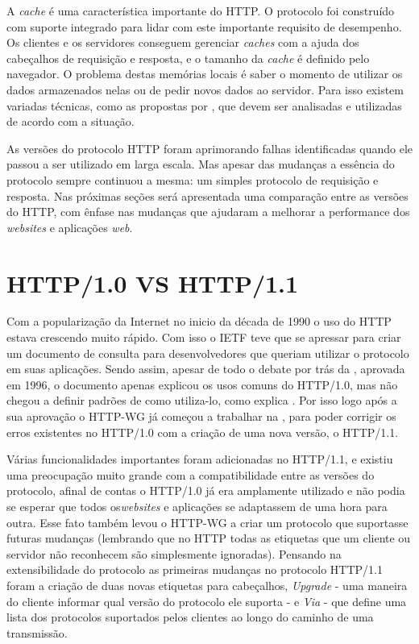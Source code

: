

A \textit{cache} é uma característica importante do HTTP. O protocolo foi construído com suporte integrado para lidar com este importante requisito de desempenho. Os clientes e os servidores conseguem gerenciar \textit{caches} com a ajuda dos cabeçalhos de requisição e resposta, e o tamanho da \textit{cache} é definido pelo navegador. O problema destas memórias locais é saber o momento de utilizar os dados armazenados nelas ou de pedir novos dados ao servidor. Para isso existem variadas técnicas, como as propostas por \cite{HighPerformance}, que devem ser analisadas e utilizadas de acordo com a situação.

As versões do protocolo HTTP foram aprimorando falhas identificadas quando ele passou a ser utilizado em larga escala. Mas apesar das mudanças a essência do protocolo sempre continuou a mesma: um simples protocolo de requisição e resposta. Nas próximas seções será apresentada uma comparação entre as versões do HTTP, com ênfase nas mudanças que ajudaram a melhorar a performance dos \textit{websites} e aplicações \textit{web}.

\section{HTTP/1.0 VS HTTP/1.1}
\label{sec:http_10_vs_http_11}

Com a popularização da Internet no inicio da década de 1990 o uso do HTTP estava crescendo muito rápido. Com isso o IETF teve que se apressar para criar um documento de consulta para desenvolvedores que queriam utilizar o protocolo em suas aplicações. Sendo assim, apesar de todo o debate por trás da \cite{RFC1945}, aprovada em 1996, o documento apenas explicou os usos comuns do HTTP/1.0, mas não chegou a definir padrões de como utiliza-lo, como explica \cite{KeyDifferencesHTTP}. Por isso logo após a sua aprovação o HTTP-WG já começou a trabalhar na \cite{RFC2616}, para poder corrigir os erros existentes no HTTP/1.0 com a criação de uma nova versão, o HTTP/1.1.

Várias funcionalidades importantes foram adicionadas no HTTP/1.1, e existiu uma preocupação muito grande com a compatibilidade entre as versões do protocolo, afinal de contas o HTTP/1.0 já era amplamente utilizado e não podia se esperar que todos os\textit{websites} e aplicações se adaptassem de uma hora para outra. Esse fato também levou o HTTP-WG a criar um protocolo que suportasse futuras mudanças (lembrando que no HTTP todas as etiquetas que um cliente ou servidor não reconhecem são simplesmente ignoradas). Pensando na extensibilidade do protocolo as primeiras mudanças no protocolo HTTP/1.1 foram a criação de duas novas etiquetas para cabeçalhos, \textit{Upgrade} - uma maneira do cliente informar qual versão do protocolo ele suporta - e \textit{Via} - que define uma lista dos protocolos suportados pelos clientes ao longo do caminho de uma transmissão.

